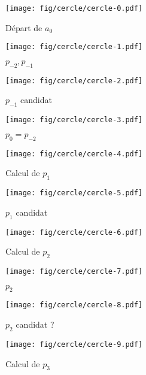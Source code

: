 \documentclass{beamer}
\begin{document}
\begin{frame}
\begin{columns}[t]
  \begin{column}{6cm}
    {
      \begin{figure}[h!]
        \centering
        \texttt{[image: fig/cercle/cercle-0.pdf]}
        \caption{Départ de $a_{0}$}
    \end{figure}
    }
    {
      \begin{figure}[h!]
        \centering
        \texttt{[image: fig/cercle/cercle-1.pdf]}
        \caption{$p_{-2}, p_{-1}$}
    \end{figure}
    }
    {
      \begin{figure}[h!]
        \centering
        \texttt{[image: fig/cercle/cercle-2.pdf]}
        \caption{$p_{-1}$ candidat}
    \end{figure}
    }
    {
      \begin{figure}[h!]
        \centering
        \texttt{[image: fig/cercle/cercle-3.pdf]}
        \caption{$p_{0} = p_{-2}$}
    \end{figure}
    }
    {
      \begin{figure}[h!]
        \centering
        \texttt{[image: fig/cercle/cercle-4.pdf]}
        \caption{Calcul de $p_{1}$}
    \end{figure}
    }
    {
      \begin{figure}[h!]
        \centering
        \texttt{[image: fig/cercle/cercle-5.pdf]}
        \caption{$p_{1}$ candidat}
    \end{figure}
    }
    {
      \begin{figure}[h!]
        \centering
        \texttt{[image: fig/cercle/cercle-6.pdf]}
        \caption{Calcul de $p_{2}$}
    \end{figure}
    }
    {
      \begin{figure}[h!]
        \centering
        \texttt{[image: fig/cercle/cercle-7.pdf]}
        \caption{$p_{2}$}
    \end{figure}
    }
    {
      \begin{figure}[h!]
        \centering
        \texttt{[image: fig/cercle/cercle-8.pdf]}
        \caption{$p_{2}$ candidat ?}
    \end{figure}
    }
    {
      \begin{figure}[h!]
        \centering
        \texttt{[image: fig/cercle/cercle-9.pdf]}
        \caption{Calcul de $p_{3}$}

\end{figure}}
\end{column}
\end{columns}
\end{frame}
\end{document}
